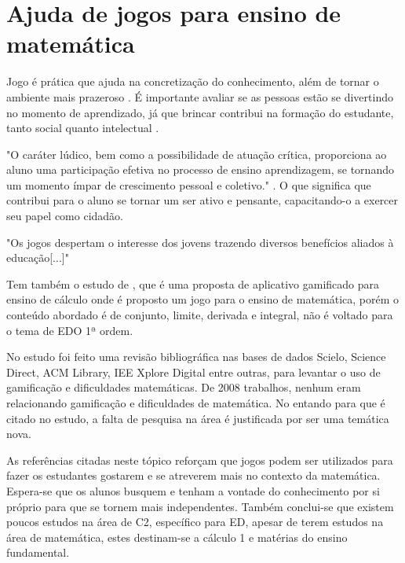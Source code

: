 \section[Ajuda de jogos para ensino de matemática]{Ajuda de jogos para ensino de matemática}
Jogo é prática que ajuda na concretização do conhecimento, além de tornar o ambiente mais prazeroso \cite{jogoPratPedagoc}. É importante avaliar se as pessoas estão se divertindo no momento de aprendizado, já que brincar contribui na formação do estudante, tanto social quanto intelectual \cite{jogoPratPedagoc}.

"O caráter lúdico, bem como a possibilidade de atuação crítica, proporciona ao aluno uma participação efetiva no processo de ensino aprendizagem, se tornando um momento ímpar de crescimento pessoal e coletivo."  \cite{jogoPratPedagoc}. O que significa que contribui para o aluno se tornar um ser ativo e pensante, capacitando-o a exercer seu papel como cidadão.

"Os jogos despertam o interesse dos jovens trazendo diversos benefícios aliados à
educação[...]" \cite{appcalculo}

\begin{comment}
Gamificação foca em elementos como desafios, níveis, avatar, conquistas, histórias, pontos (Gustavo Fortes Tondello, PhD). Esses elementos são utilizados para engajamento do jogador.

Completar missões e derrotar um chefão faz o jogador se sentir competente (Gustavo Fortes Tondello, PhD).
Ser capaz de escolher diferentes caminhos ou criar coisas diferentes faz o jogador se sentir autônomo (Gustavo Fortes Tondello, PhD).
\end{comment}

Tem também o estudo de \cite{appcalculo}, que é uma proposta de aplicativo gamificado para ensino de cálculo onde é proposto um jogo para o ensino de matemática, porém o conteúdo abordado é de conjunto, limite, derivada e integral, não é voltado para o tema de EDO 1ª ordem.

No estudo \cite{revbibmatgam} foi feito uma revisão bibliográfica nas bases de dados Scielo, Science Direct, ACM Library, IEE Xplore Digital entre outras, para levantar o uso de gamificação e dificuldades matemáticas. De 2008 trabalhos, nenhum eram relacionando gamificação e dificuldades de matemática. No entando para \cite{dicheva} que é citado no estudo, a falta de pesquisa na área é justificada por ser uma temática nova.

As referências citadas neste tópico reforçam que jogos podem ser utilizados para fazer os estudantes gostarem e se atreverem mais no contexto da matemática. Espera-se que os alunos busquem e tenham a vontade do conhecimento por si próprio para que se tornem mais independentes. Também conclui-se que existem poucos estudos na área de C2, específico para ED, apesar de terem estudos na área de matemática, estes destinam-se a cálculo 1 e matérias do ensino fundamental.

